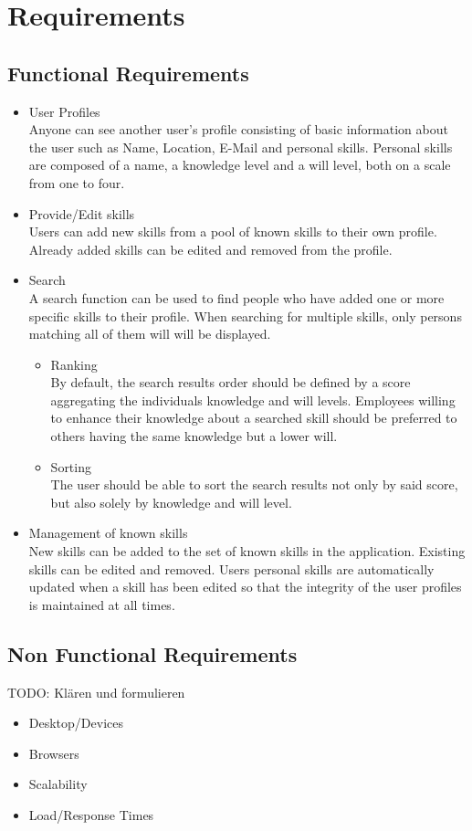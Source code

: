 \section{Requirements}
\subsection{Functional Requirements}
\begin{itemize}
	\item User Profiles \\
	Anyone can see another user’s profile consisting of basic information about the user such as Name, Location, E-Mail and personal skills. Personal skills are composed of a name, a knowledge level and a will level, both on a scale from one to four.
	\item Provide/Edit skills\\
	Users can add new skills from a pool of known skills to their own profile. Already added skills can be edited and removed from the profile.
	\item Search\\
	A search function can be used to find people who have added one or more specific skills to their profile. When searching for multiple skills, only persons matching all of them will will be displayed.
	\begin{itemize}
		\item Ranking\\
			By default, the search results order should be defined by a score aggregating the individuals knowledge and will levels. Employees willing to enhance their knowledge about a searched skill should be preferred to others having the same knowledge but a lower will.
		\item Sorting\\
			The user should be able to sort the search results not only by said score,
			but also solely by knowledge and will level.
	\end{itemize}
	\item Management of known skills\\
	New skills can be added to the set of known skills in the application. Existing skills can be edited and removed. Users personal skills are automatically updated when a skill has been edited so that the integrity of the user profiles is maintained at all times.
\end{itemize}



\subsection{Non Functional Requirements}
TODO: Klären und formulieren
\begin{itemize}
	\item Desktop/Devices
	\item Browsers
	\item Scalability
	\item Load/Response Times
\end{itemize}


